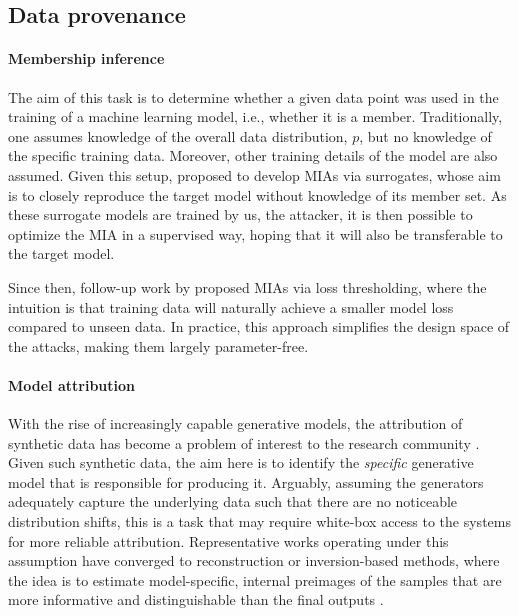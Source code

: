 \documentclass{article}
\theoremstyle{remark}
\begin{document}
\subsection{Data provenance}

\paragraph{Membership inference} The aim of this task is to determine whether a given data point was used in the training of a machine learning model, i.e., whether it is a member. Traditionally, one assumes knowledge of the overall data distribution, $p$, but no knowledge of the specific training data. Moreover, other training details of the model are also assumed. Given this setup, \citet{7958568} proposed to develop MIAs via surrogates, whose aim is to closely reproduce the target model without knowledge of its member set. As these surrogate models are trained by us, the attacker, it is then possible to optimize the MIA in a supervised way, hoping that it will also be transferable to the target model.

Since then, follow-up work by \citet{8429311} proposed MIAs via loss thresholding, where the intuition is that training data will naturally achieve a smaller model loss compared to unseen data. In practice, this approach simplifies the design space of the attacks, making them largely parameter-free.

\paragraph{Model attribution} With the rise of increasingly capable generative models, the attribution of synthetic data has become a problem of interest to the research community \citep{wang2023where, pmlr-v235-laszkiewicz24a, 10.1007/978-3-031-73033-7_16}. Given such synthetic data, the aim here is to identify the \textit{specific} generative model that is responsible for producing it. Arguably, assuming the generators adequately capture the underlying data such that there are no noticeable distribution shifts, this is a task that may require white-box access to the systems for more reliable attribution. Representative works operating under this assumption have converged to reconstruction or inversion-based methods, where the idea is to estimate model-specific, internal preimages of the samples that are more informative and distinguishable than the final outputs \citep{wang2023where, pmlr-v235-laszkiewicz24a}.
\end{document}
